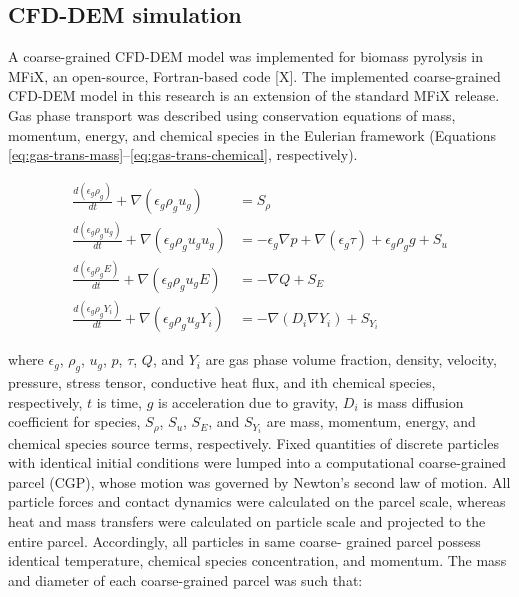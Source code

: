 
\subsection{CFD-DEM simulation}

A coarse-grained CFD-DEM model was implemented for biomass pyrolysis in MFiX, an open-source, Fortran-based code [X]. The implemented coarse-grained CFD-DEM model in this research is an extension of the standard MFiX release. Gas phase transport was described using conservation equations of mass, momentum, energy, and chemical species in the Eulerian framework (Equations \ref{eq:gas-trans-mass}--\ref{eq:gas-trans-chemical}, respectively).

\begin{align}
    \frac{d(\epsilon_g \rho_g)}{dt} + \nabla (\epsilon_g \rho_g u_g) &= S_\rho \label{eq:gas-trans-mass} \\
    \frac{d(\epsilon_g \rho_g u_g)}{dt} + \nabla (\epsilon_g \rho_g u_g u_g) &= -\epsilon_g \nabla p + \nabla (\epsilon_g \tau) + \epsilon_g \rho_g g + S_u \\
    \frac{d(\epsilon_g \rho_g E)}{dt} + \nabla (\epsilon_g \rho_g u_g E) &= -\nabla Q + S_E \\
    \frac{d(\epsilon_g \rho_g Y_i)}{dt} + \nabla (\epsilon_g \rho_g u_g Y_i) &= -\nabla (D_i \nabla Y_i) + S_{Y_i} \label{eq:gas-trans-chemical}
\end{align}

where $\epsilon_g$, $\rho_g$, $u_g$, $p$, $\tau$, $Q$, and $Y_i$ are gas phase volume fraction, density, velocity, pressure, stress tensor, conductive heat flux, and ith chemical species, respectively, $t$ is time, $g$ is acceleration due to gravity, $D_i$ is mass diffusion coefficient for species, $S_\rho$, $S_u$, $S_E$, and $S_{Y_i}$ are mass, momentum, energy, and chemical species source terms, respectively. Fixed quantities of discrete particles with identical initial conditions were lumped into a computational coarse-grained parcel (CGP), whose motion was governed by Newton’s second law of motion. All particle forces and contact dynamics were calculated on the parcel scale, whereas heat and mass transfers were calculated on particle scale and projected to the entire parcel. Accordingly, all particles in same coarse- grained parcel possess identical temperature, chemical species concentration, and momentum. The mass and diameter of each coarse-grained parcel was such that:

